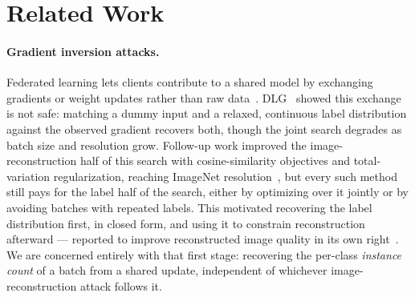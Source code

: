 %

\newcommand{\ourmethod}{ZLI}

\section{Related Work}
\label{sec:related}

\paragraph{Gradient inversion attacks.}
Federated learning lets clients contribute to a shared model by exchanging
gradients or weight updates rather than raw data~\cite{mcmahan2017fedavg}.
DLG~\cite{zhu2019dlg} showed this exchange is not safe: matching a dummy
input and a relaxed, continuous label distribution against the observed
gradient recovers both, though the joint search degrades as batch size and
resolution grow. Follow-up work improved the image-reconstruction half of
this search with cosine-similarity objectives and total-variation
regularization, reaching ImageNet resolution~\cite{geng2022zlg}, but every
such method still pays for the label half of the search, either by
optimizing over it jointly or by avoiding batches with repeated labels.
This motivated recovering the label distribution first, in closed form,
and using it to constrain reconstruction afterward --- reported to improve
reconstructed image quality in its own right~\cite{ma2023ilrg,chen2024rlu}.
We are concerned entirely with that first stage: recovering the per-class
\emph{instance count} of a batch from a shared update, independent of
whichever image-reconstruction attack follows it.

